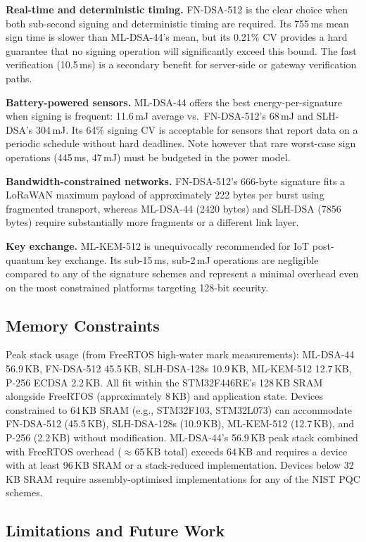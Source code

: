 \documentclass[iicol]{sn-jnl}
\begin{document}
\textbf{Real-time and deterministic timing.}
FN-DSA-512 is the clear choice when both sub-second signing and
deterministic timing are required.
Its 755\,ms mean sign time is slower than ML-DSA-44's mean, but its
0.21\% CV provides a hard guarantee that no signing operation will
significantly exceed this bound.
The fast verification (10.5\,ms) is a secondary benefit for
server-side or gateway verification paths.

\textbf{Battery-powered sensors.}
ML-DSA-44 offers the best energy-per-signature when signing is frequent:
11.6\,mJ average vs.\ FN-DSA-512's 68\,mJ and SLH-DSA's 304\,mJ.
Its 64\% signing CV is acceptable for sensors that report data on
a periodic schedule without hard deadlines.
Note however that rare worst-case sign operations (445\,ms, 47\,mJ)
must be budgeted in the power model.

\textbf{Bandwidth-constrained networks.}
FN-DSA-512's 666-byte signature fits a LoRaWAN maximum payload of
approximately 222 bytes per burst using fragmented transport, whereas
ML-DSA-44 (2420 bytes) and SLH-DSA (7856 bytes) require substantially
more fragments or a different link layer.

\textbf{Key exchange.}
ML-KEM-512 is unequivocally recommended for IoT post-quantum key exchange.
Its sub-15\,ms, sub-2\,mJ operations are negligible compared to any
of the signature schemes and represent a minimal overhead even on the
most constrained platforms targeting 128-bit security.

\subsection{Memory Constraints}

Peak stack usage (from FreeRTOS high-water mark measurements):
ML-DSA-44 56.9\,KB, FN-DSA-512 45.5\,KB, SLH-DSA-128s 10.9\,KB,
ML-KEM-512 12.7\,KB, P-256 ECDSA 2.2\,KB.
All fit within the STM32F446RE's 128\,KB SRAM alongside FreeRTOS
(approximately 8\,KB) and application state.
Devices constrained to 64\,KB SRAM (e.g., STM32F103, STM32L073)
can accommodate FN-DSA-512 (45.5\,KB), SLH-DSA-128s (10.9\,KB),
ML-KEM-512 (12.7\,KB), and P-256 (2.2\,KB) without modification.
ML-DSA-44's 56.9\,KB peak stack combined with FreeRTOS overhead
(${\approx}$65\,KB total) exceeds 64\,KB and requires a device
with at least 96\,KB SRAM or a stack-reduced implementation.
Devices below 32\,KB SRAM require assembly-optimised implementations
for any of the NIST PQC schemes.

\subsection{Limitations and Future Work}
\end{document}
